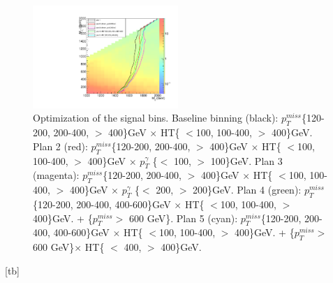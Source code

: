 \documentclass[thesis.tex]{subfiles}
\renewcommand\_{\textunderscore\allowbreak}
\begin{document}
\begin{figure}[tb]
  \centering
    \includegraphics[width=0.49\textwidth]{Figures/binningOpt.pdf}
		\caption{Optimization of the signal bins. Baseline binning (black): $p_T^{miss}$\{120-200, 200-400, $ >$ 400\}GeV $\times$ HT\{ $<$100, 100-400, $ >$ 400\}GeV. Plan 2 (red): $p_T^{miss}$\{120-200, 200-400, $ >$ 400\}GeV $\times$ HT\{ $<$100, 100-400, $ >$ 400\}GeV $\times$ $p_T^\gamma$ \{$<$ 100, $>$ 100\}GeV. Plan 3 (magenta): $p_T^{miss}$\{120-200, 200-400, $ >$ 400\}GeV $\times$ HT\{ $<$100, 100-400, $ >$ 400\}GeV $\times$ $p_T^\gamma$ \{$<$ 200, $>$ 200\}GeV. Plan 4 (green): $p_T^{miss}$\{120-200, 200-400, 400-600\}GeV $\times$ HT\{ $<$100, 100-400, $ >$ 400\}GeV. + \{$p_T^{miss} > $ 600 GeV\}. Plan 5 (cyan): $p_T^{miss}$\{120-200, 200-400, 400-600\}GeV $\times$ HT\{ $<$100, 100-400, $ >$ 400\}GeV. + \{$p_T^{miss} > $ 600 GeV\}$\times$ HT\{ $<$ 400, $ >$ 400\}GeV. }
    \label{fig:optbin}
\end{figure}[tb]
\end{document}
